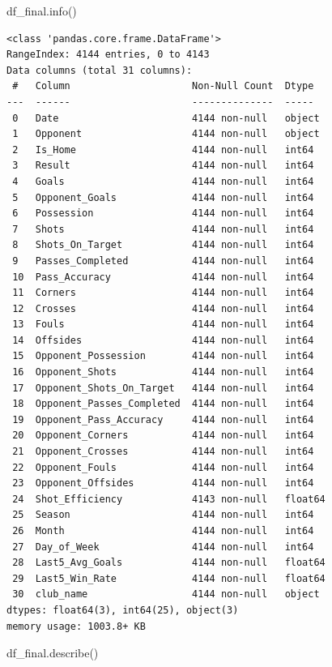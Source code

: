 \documentclass[
  letterpaper,
  DIV=11,
  numbers=noendperiod]{scrartcl}
\newenvironment{Shaded}{\begin{snugshade}}{\end{snugshade}}
\newcommand{\NormalTok}[1]{\textcolor[rgb]{0.00,0.23,0.31}{#1}}
\begin{document}
\begin{Shaded}
\begin{Highlighting}[]
\NormalTok{df\_final.info()}
\end{Highlighting}
\end{Shaded}

\begin{verbatim}
<class 'pandas.core.frame.DataFrame'>
RangeIndex: 4144 entries, 0 to 4143
Data columns (total 31 columns):
 #   Column                     Non-Null Count  Dtype  
---  ------                     --------------  -----  
 0   Date                       4144 non-null   object 
 1   Opponent                   4144 non-null   object 
 2   Is_Home                    4144 non-null   int64  
 3   Result                     4144 non-null   int64  
 4   Goals                      4144 non-null   int64  
 5   Opponent_Goals             4144 non-null   int64  
 6   Possession                 4144 non-null   int64  
 7   Shots                      4144 non-null   int64  
 8   Shots_On_Target            4144 non-null   int64  
 9   Passes_Completed           4144 non-null   int64  
 10  Pass_Accuracy              4144 non-null   int64  
 11  Corners                    4144 non-null   int64  
 12  Crosses                    4144 non-null   int64  
 13  Fouls                      4144 non-null   int64  
 14  Offsides                   4144 non-null   int64  
 15  Opponent_Possession        4144 non-null   int64  
 16  Opponent_Shots             4144 non-null   int64  
 17  Opponent_Shots_On_Target   4144 non-null   int64  
 18  Opponent_Passes_Completed  4144 non-null   int64  
 19  Opponent_Pass_Accuracy     4144 non-null   int64  
 20  Opponent_Corners           4144 non-null   int64  
 21  Opponent_Crosses           4144 non-null   int64  
 22  Opponent_Fouls             4144 non-null   int64  
 23  Opponent_Offsides          4144 non-null   int64  
 24  Shot_Efficiency            4143 non-null   float64
 25  Season                     4144 non-null   int64  
 26  Month                      4144 non-null   int64  
 27  Day_of_Week                4144 non-null   int64  
 28  Last5_Avg_Goals            4144 non-null   float64
 29  Last5_Win_Rate             4144 non-null   float64
 30  club_name                  4144 non-null   object 
dtypes: float64(3), int64(25), object(3)
memory usage: 1003.8+ KB
\end{verbatim}

\begin{Shaded}
\begin{Highlighting}[]
\NormalTok{df\_final.describe()}
\end{Highlighting}
\end{Shaded}
\end{document}
